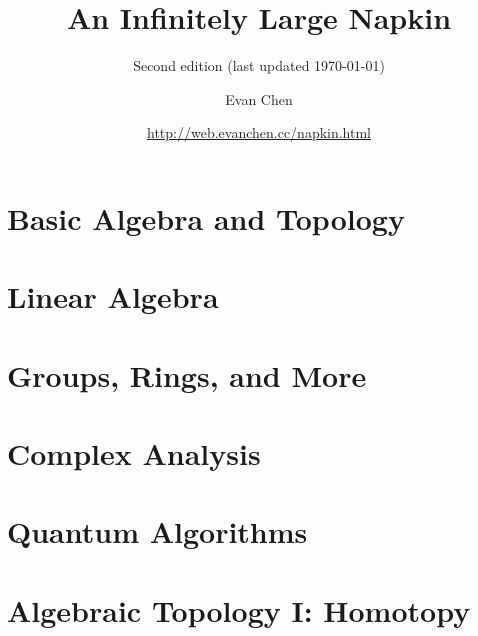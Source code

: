 \documentclass[11pt,numbers=noenddot]{scrreprt}
\begin{document}
\doparttoc[n]

\title{An Infinitely Large Napkin}
\subtitle{Second edition (last updated \today)}
\author{Evan Chen}
\date{\url{http://web.evanchen.cc/napkin.html}}
\maketitle




\tableofcontents



\part{Basic Algebra and Topology}






\part{Linear Algebra}





\part{Groups, Rings, and More}





\part{Complex Analysis}



%

\part{Quantum Algorithms}



\part{Algebraic Topology I: Homotopy}


\end{document}
